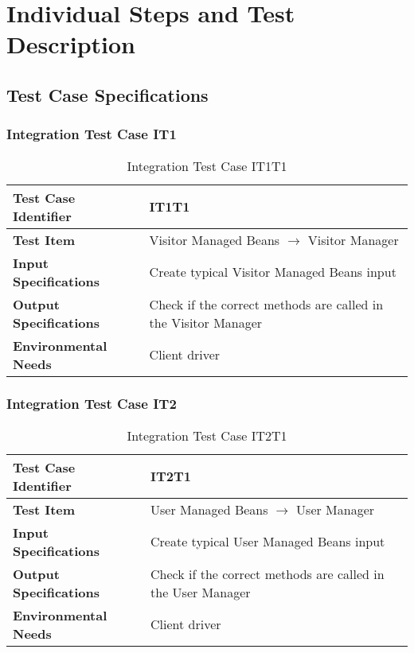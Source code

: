 \section{Individual Steps and Test Description} \label{sec:istd}
\subsection{Test Case Specifications}
\vspace{10pt}
\subsubsection{Integration Test Case IT1} \label{sssec:IT1}
\vspace{16pt}
\begin{table}[htbp]
\begin{center}
\renewcommand{\arraystretch}{1.5}
\begin{tabular}{l|p{}}
\hline
\textbf{Test Case Identifier} & IT1T1\\
\hline
\textbf{Test Item} & Visitor Managed Beans $\rightarrow$ Visitor Manager\\
\hline
\textbf{Input Specifications} & Create typical Visitor Managed Beans input \\
\hline
\textbf{Output Specifications} & Check if the correct methods are called in the Visitor Manager \\
\hline
\textbf{Environmental Needs} & Client driver\\
\hline
\end{tabular}
\caption{Integration Test Case IT1T1}
\end{center}
\end{table}

\vspace{10pt}
\subsubsection{Integration Test Case IT2} \label{sssec:IT2}
\vspace{16pt}
\begin{table}[htbp]
\begin{center}
\renewcommand{\arraystretch}{1.5}
\begin{tabular}{l|p{}}
\hline
\textbf{Test Case Identifier} & IT2T1\\
\hline
\textbf{Test Item} & User Managed Beans $\rightarrow$ User Manager\\
\hline
\textbf{Input Specifications} & Create typical User Managed Beans input \\
\hline
\textbf{Output Specifications} & Check if the correct methods are called in the User Manager \\
\hline
\textbf{Environmental Needs} & Client driver\\
\hline
\end{tabular}
\caption{Integration Test Case IT2T1}
\end{center}
\end{table}
\clearpage

